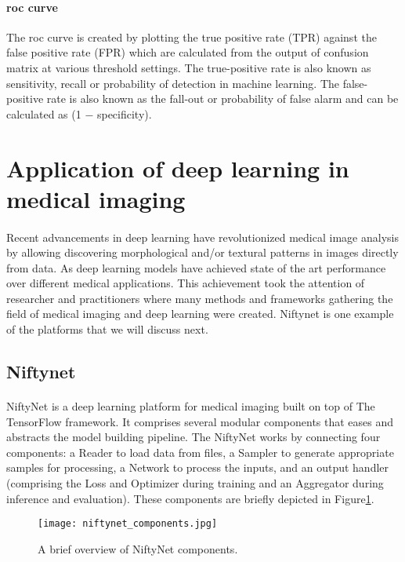 \paragraph{\acs{roc} curve}
The \acs{roc} curve is created by plotting the true positive rate (TPR) against the false positive rate (FPR) which are calculated from the output of confusion matrix at various threshold settings. The true-positive rate is also known as sensitivity, recall or probability of detection in machine learning. The false-positive rate is also known as the fall-out or probability of false alarm and can be calculated as (1 − specificity).
\section{Application of deep learning in medical imaging}
\paragraph{}
Recent advancements in deep learning have revolutionized medical image analysis by allowing discovering morphological and/or textural patterns in images directly from data. As deep learning models have achieved state of the art performance over different medical applications. This achievement took the attention of researcher and practitioners where many methods and frameworks gathering the field of medical imaging and deep learning were created. Niftynet is one example of the platforms that we will discuss next.
\subsection{Niftynet}
\paragraph{}
NiftyNet is a deep learning platform for medical imaging built on top of The TensorFlow framework\cite{tensorflow}. It comprises several modular components that eases and abstracts the model building pipeline. The NiftyNet works by connecting four components: a Reader to load data from files, a Sampler to generate appropriate samples for processing, a Network to process the inputs, and an output handler (comprising the Loss and Optimizer during training and an Aggregator during inference and evaluation). These components are briefly depicted in Figure\ref{niftynet_components}.\cite{niftyNet}
\begin{figure}[h]
 \texttt{[image: niftynet\_components.jpg]}
 \centering         
 \caption{A brief overview of NiftyNet components\cite{niftyNet}.}
 \label{niftynet_components}
\end{figure}

